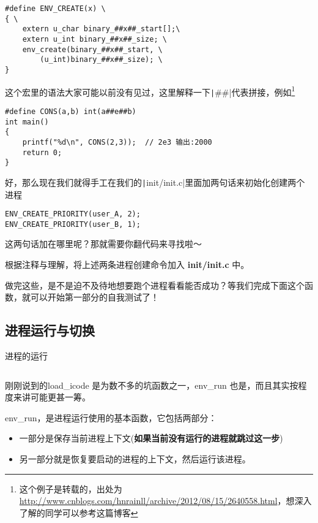 \begin{verbatim}
#define ENV_CREATE(x) \
{ \
    extern u_char binary_##x##_start[];\
    extern u_int binary_##x##_size; \
    env_create(binary_##x##_start, \
        (u_int)binary_##x##_size); \
}
\end{verbatim}

这个宏里的语法大家可能以前没有见过，这里解释一下\texttt|##|代表拼接，例如\footnote{这个例子是转载的，出处为\url{http://www.cnblogs.com/hnrainll/archive/2012/08/15/2640558.html}，想深入了解的同学可以参考这篇博客}

\begin{verbatim}
#define CONS(a,b) int(a##e##b) 
int main() 
{
    printf("%d\n", CONS(2,3));  // 2e3 输出:2000 
    return 0; 
}
\end{verbatim}

好，那么现在我们就得手工在我们的\texttt|init/init.c|里面加两句话来初始化创建两个进程

\begin{verbatim}
ENV_CREATE_PRIORITY(user_A, 2);
ENV_CREATE_PRIORITY(user_B, 1);
\end{verbatim}

这两句话加在哪里呢？那就需要你翻代码来寻找啦～

\begin{exercise}
根据注释与理解，将上述两条进程创建命令加入 \textbf{init/init.c} 中。
\end{exercise}

做完这些，是不是迫不及待地想要跑个进程看看能否成功？等我们完成下面这个函数，就可以开始第一部分的自我测试了！

\subsection{进程运行与切换}

\begin{codeBoxWithCaption}{进程的运行\label{code:env_run.c}}
  \inputminted[linenos]{c}{codes/env_run.c}
\end{codeBoxWithCaption}

刚刚说到的load\_icode 是为数不多的坑函数之一，env\_run 也是，而且其实按程度来讲可能更甚一筹。

env\_run，是进程运行使用的基本函数，它包括两部分：
\begin{itemize}
  \item 一部分是保存当前进程上下文(\textbf{如果当前没有运行的进程就跳过这一步})
  \item 另一部分就是恢复要启动的进程的上下文，然后运行该进程。
\end{itemize}


